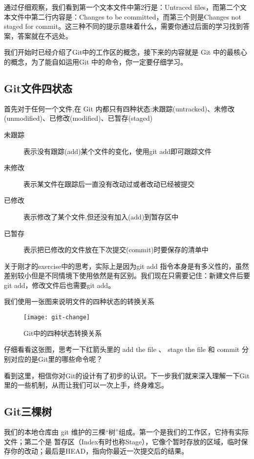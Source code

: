 通过仔细观察，我们看到第一个文本文件中第2行是：Untraced files，而第二个文本文件中第二行内容是：Changes to be committed，而第三个则是Changes not staged for commit。这三种不同的提示意味着什么，需要你通过后面的学习找到答案，答案就在不远处。

我们开始时已经介绍了Git中的工作区的概念，接下来的内容就是 Git 中的最核心的概念，为了能自如运用Git 中的命令，你一定要仔细学习。

\subsection{Git文件四状态}
首先对于任何一个文件,在 Git 内都只有四种状态:未跟踪(untracked)、未修改(unmodified)、已修改(modified)、已暂存(staged)
\begin{description}
\item[未跟踪] 表示没有跟踪(add)某个文件的变化，使用git add即可跟踪文件
\item[未修改] 表示某文件在跟踪后一直没有改动过或者改动已经被提交
\item[已修改] 表示修改了某个文件,但还没有加入(add)到暂存区中
\item[已暂存] 表示把已修改的文件放在下次提交(commit)时要保存的清单中
\end{description}

\begin{note}
关于刚才的exercise中的思考，实际上是因为git add 指令本身是有多义性的，虽然差别较小但是不同情境下使用依然是有区别。我们现在只需要记住：新建文件后要git add，修改文件后也需要git add。
\end{note}

我们使用一张图来说明文件的四种状态的转换关系

\begin{figure}[htbp]
	\centering
	\texttt{[image: git-change]}
	\caption{Git中的四种状态转换关系}\label{fig:git-change}
\end{figure}

\begin{exercise}
仔细看看这张图，思考一下红箭头里的 add the file 、 stage the file 和 commit 分别对应的是Git里的哪些命令呢？
\end{exercise}

看到这里，相信你对Git的设计有了初步的认识。下一步我们就来深入理解一下Git里的一些机制，从而让我们可以一次上手，终身难忘。

\subsection{Git三棵树}\label{Git三棵树}
我们的本地仓库由 git 维护的三棵“树”组成。第一个是我们的工作区，它持有实际文件；第二个是 暂存区（Index有时也称Stage），它像个暂时存放的区域，临时保存你的改动；最后是HEAD，指向你最近一次提交后的结果。

